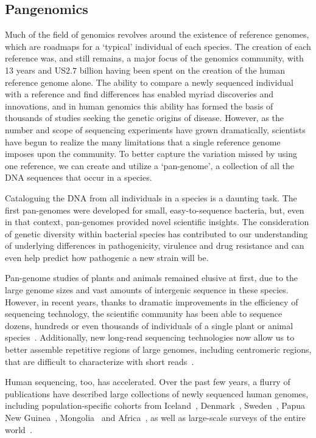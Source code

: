 \subsection{Pangenomics}

Much of the field of genomics revolves around the existence of reference genomes, which are roadmaps for a ‘typical’ individual of each species. The creation of each reference was, and still remains, a major focus of the genomics community, with 13 years and US$2.7$ billion having been spent on the creation of the human reference genome alone. The ability to compare a newly sequenced individual with a reference and find differences has enabled myriad discoveries and innovations, and in human genomics this ability has formed the basis of thousands of studies seeking the genetic origins of disease. However, as the number and scope of sequencing experiments have grown dramatically, scientists have begun to realize the many limitations that a single reference genome imposes upon the community. To better capture the variation missed by using one reference, we can create and utilize a ‘pan-genome’, a collection of all the DNA sequences that occur in a species.

Cataloguing the DNA from all individuals in a species is a daunting task. The first pan-genomes were developed for small, easy-to-sequence bacteria, but, even in that context, pan-genomes provided novel scientific insights. The consideration of genetic diversity within bacterial species has contributed to our understanding of underlying differences in pathogenicity, virulence and drug resistance and can even help predict how pathogenic a new strain will be.

Pan-genome studies of plants and animals remained elusive at first, due to the large genome sizes and vast amounts of intergenic sequence in these species. However, in recent years, thanks to dramatic improvements in the efficiency of sequencing technology, the scientific community has been able to sequence dozens, hundreds or even thousands of individuals of a single plant or animal species~\cite{XXX}. Additionally, new long-read sequencing technologies now allow us to better assemble repetitive regions of large genomes, including centromeric regions, that are difficult to characterize with short reads~\cite{XXX}.

Human sequencing, too, has accelerated. Over the past few years, a flurry of publications have described large collections of newly sequenced human genomes, including population-specific cohorts from Iceland~\cite{XXX}, Denmark~\cite{XXX}, Sweden~\cite{XXX}, Papua New Guinea~\cite{XXX}, Mongolia~\cite{XXX} and Africa~\cite{XXX}, as well as large-scale surveys of the entire world~\cite{XXX}. 

